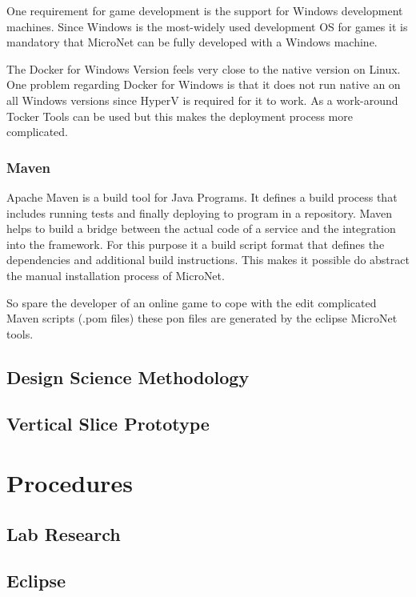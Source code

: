 One requirement for game development is the support for Windows development
machines. Since Windows is the most-widely used development OS for games it is
mandatory that MicroNet can be fully developed with a Windows machine. 

The Docker for Windows Version feels very close to the native version on Linux.
One problem regarding Docker for Windows is that it does not run native an on
all Windows versions since HyperV is required for it to work. As a work-around
Tocker Tools can be used but this makes the deployment process more complicated.

\subsubsection{Maven}

Apache Maven is a build tool for Java Programs. It defines a build process that
includes running tests and finally deploying to program in a repository. Maven
helps to build a bridge between the actual code of a service and the integration
into the framework. For this purpose it a build script format that defines the
dependencies and additional build instructions. This makes it possible do
abstract the manual installation process of MicroNet. 

So spare the developer of an online game to cope with the edit complicated Maven
scripts (.pom files) these pon files are generated by the eclipse MicroNet
tools.

\subsection{Design Science Methodology}
\subsection{Vertical Slice Prototype}

\section{Procedures}

\subsection{Lab Research}

\subsection{Eclipse}

